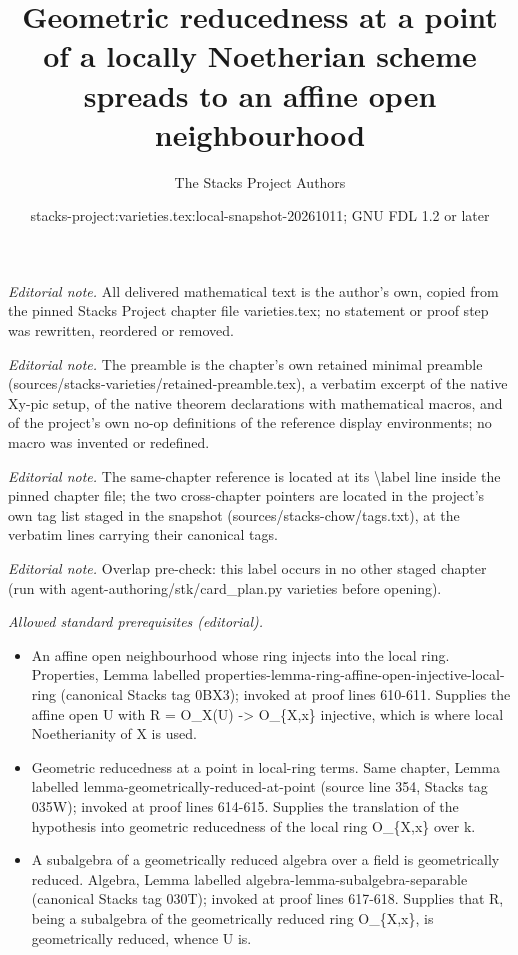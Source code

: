 \documentclass[10pt,a4paper]{amsart}
\title{Geometric reducedness at a point of a locally Noetherian scheme spreads to an affine open neighbourhood}
\author{The Stacks Project Authors}
\date{stacks-project:varieties.tex:local-snapshot-20261011; GNU FDL 1.2 or later}
\theoremstyle{plain}
\theoremstyle{definition}
\theoremstyle{remark}
\numberwithin{equation}{subsection}
\begin{document}
\maketitle
\noindent\textit{Editorial note.} All delivered mathematical text is the author's own, copied from the pinned Stacks Project chapter file varieties.tex; no statement or proof step was rewritten, reordered or removed.\par\medskip
\noindent\textit{Editorial note.} The preamble is the chapter's own retained minimal preamble (sources/stacks-varieties/retained-preamble.tex), a verbatim excerpt of the native Xy-pic setup, of the native theorem declarations with mathematical macros, and of the project's own no-op definitions of the reference display environments; no macro was invented or redefined.\par\medskip
\noindent\textit{Editorial note.} The same-chapter reference is located at its \textbackslash{}label line inside the pinned chapter file; the two cross-chapter pointers are located in the project's own tag list staged in the snapshot (sources/stacks-chow/tags.txt), at the verbatim lines carrying their canonical tags.\par\medskip
\noindent\textit{Editorial note.} Overlap pre-check: this label occurs in no other staged chapter (run with agent-authoring/stk/card\_plan.py varieties before opening).\par\medskip
\noindent\textit{Allowed standard prerequisites (editorial).}\begin{itemize}
\item An affine open neighbourhood whose ring injects into the local ring. Properties, Lemma labelled properties-lemma-ring-affine-open-injective-local-ring (canonical Stacks tag 0BX3); invoked at proof lines 610-611. Supplies the affine open U with R = O\_X(U) -> O\_\{X,x\} injective, which is where local Noetherianity of X is used.
\item Geometric reducedness at a point in local-ring terms. Same chapter, Lemma labelled lemma-geometrically-reduced-at-point (source line 354, Stacks tag 035W); invoked at proof lines 614-615. Supplies the translation of the hypothesis into geometric reducedness of the local ring O\_\{X,x\} over k.
\item A subalgebra of a geometrically reduced algebra over a field is geometrically reduced. Algebra, Lemma labelled algebra-lemma-subalgebra-separable (canonical Stacks tag 030T); invoked at proof lines 617-618. Supplies that R, being a subalgebra of the geometrically reduced ring O\_\{X,x\}, is geometrically reduced, whence U is.
\end{itemize}\medskip
\end{document}

